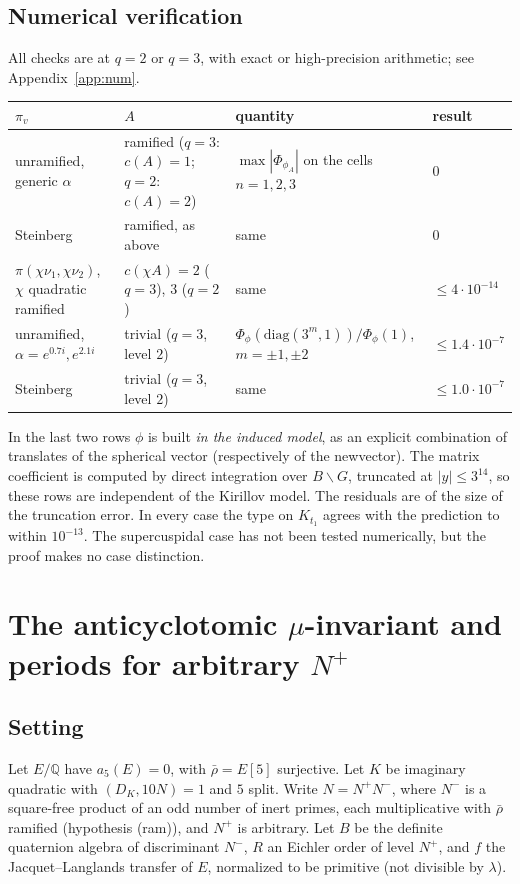\documentclass[11pt]{amsart}
\theoremstyle{definition}
\theoremstyle{remark}
\newcommand{\Q}{\mathbb{Q}}
\newcommand{\diag}{\mathrm{diag}}
\begin{document}
\subsection{Numerical verification}
All checks are at $q=2$ or $q=3$, with exact or high-precision arithmetic; see Appendix~\ref{app:num}.
\begin{center}
{\small
\begin{tabular}{p{3.6cm}p{3.6cm}p{4.2cm}p{1.9cm}}
\toprule
$\pi_v$ & $A$ & quantity & result\\ \midrule
unramified, generic $\alpha$ & ramified ($q=3$: $c(A)=1$; $q=2$: $c(A)=2$) & $\max|\Phi_{\phi_A}|$ on the cells $n=1,2,3$ & $0$\\
Steinberg & ramified, as above & same & $0$\\
$\pi(\chi\nu_1,\chi\nu_2)$, $\chi$ quadratic ramified & $c(\chi A)=2$ ($q=3$), $3$ ($q=2$) & same & $\le 4\cdot10^{-14}$\\
unramified, $\alpha=e^{0.7i},e^{2.1i}$ & trivial ($q=3$, level $2$) & $\Phi_{\phi}(\diag(3^m,1))/\Phi_\phi(1)$, $m=\pm1,\pm2$ & $\le1.4\cdot10^{-7}$\\
Steinberg & trivial ($q=3$, level $2$) & same & $\le1.0\cdot10^{-7}$\\ \bottomrule
\end{tabular}}
\end{center}
In the last two rows $\phi$ is built \emph{in the induced model}, as an explicit combination of translates of the spherical vector (respectively of the newvector). The matrix coefficient is computed by direct integration over $B\backslash G$, truncated at $|y|\le3^{14}$, so these rows are independent of the Kirillov model. The residuals are of the size of the truncation error. In every case the type on $K_{t_1}$ agrees with the prediction to within $10^{-13}$. The supercuspidal case has not been tested numerically, but the proof makes no case distinction.

\section{The anticyclotomic $\mu$-invariant and periods for arbitrary $N^+$}\label{sec:B}
\subsection{Setting}
Let $E/\Q$ have $a_5(E)=0$, with $\bar\rho=E[5]$ surjective. Let $K$ be imaginary quadratic with $(D_K,10N)=1$ and $5$ split. Write $N=N^+N^-$, where $N^-$ is a square-free product of an odd number of inert primes, each multiplicative with $\bar\rho$ ramified (hypothesis (ram)), and $N^+$ is arbitrary. Let $B$ be the definite quaternion algebra of discriminant $N^-$, $R$ an Eichler order of level $N^+$, and $f$ the Jacquet--Langlands transfer of $E$, normalized to be primitive (not divisible by $\lambda$).
\end{document}
